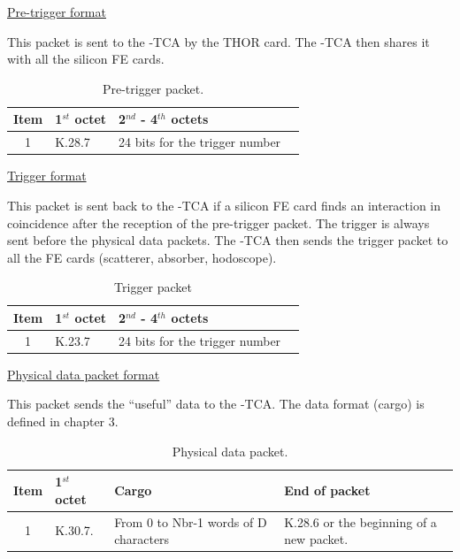 \underline{Pre-trigger format\newline}

This packet is sent to the \charmu-TCA by the THOR card. The \charmu-TCA then shares it with all the silicon FE cards.\newline

\begin{table} [!htbp]
  \centering
  \caption{Pre-trigger packet.}
\begin{tabular}{|c|p{4cm}|p{6cm}|p{6cm}|}
\hline
\bf{Item}  			& 	\bf{1$^{st}$ octet}	& \bf{2$^{nd}$ - 4$^{th}$ octets}\\
\hline
1			& K.28.7	&	24 bits for the trigger number\\
\hline
\end{tabular}
\end{table}

\underline{Trigger format\newline}

This packet is sent back to the \charmu-TCA if a silicon FE card finds an interaction in coincidence after the reception of the pre-trigger packet. The trigger is always sent before the physical data packets. The  \charmu-TCA then sends the trigger packet to all the FE cards (scatterer, absorber, hodoscope).

\begin{table} [!htbp]
  \centering
  \caption{Trigger packet}
\begin{tabular}{|c|p{4cm}|p{6cm}|p{6cm}|}
\hline
\bf{Item}  			& 	\bf{1$^{st}$ octet}	& \bf{2$^{nd}$ - 4$^{th}$ octets}\\
\hline
1			& K.23.7	&	24 bits for the trigger number\\
\hline
\end{tabular}
\end{table}

\newpage
\underline{Physical data packet format\newline}

This packet sends the \enquote{useful} data to the \charmu-TCA. The data format (cargo) is defined in chapter 3.

\begin{table} [!htbp]
  \centering
  \caption{Physical data packet.}
\begin{tabular}{|c|p{4cm}|p{4cm}|p{4cm}|}
\hline
\bf{Item}  			& 	\bf{1$^{st}$ octet}	& \bf{Cargo} & \bf{End of packet} \\
\hline
	1				&	K.30.7.		& From 0 to Nbr-1 words of D characters & K.28.6 or the beginning of a new packet.\\
\hline
\end{tabular}
\end{table}

